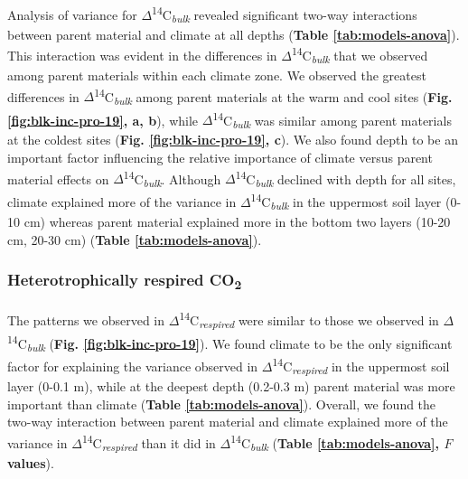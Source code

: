 \documentclass[english,man,floatsintext]{apa6}
\begin{document}
Analysis of variance for \(\Delta\)\textsuperscript{14}C\textsubscript{\emph{bulk}} revealed significant two-way interactions between parent material and climate at all depths (\textbf{Table \ref{tab:models-anova}}). This interaction was evident in the differences in \(\Delta\)\textsuperscript{14}C\textsubscript{\emph{bulk}} that we observed among parent materials within each climate zone. We observed the greatest differences in \(\Delta\)\textsuperscript{14}C\textsubscript{\emph{bulk}} among parent materials at the warm and cool sites (\textbf{Fig. \ref{fig:blk-inc-pro-19}, a, b}), while \(\Delta\)\textsuperscript{14}C\textsubscript{\emph{bulk}} was similar among parent materials at the coldest sites (\textbf{Fig. \ref{fig:blk-inc-pro-19}, c}). We also found depth to be an important factor influencing the relative importance of climate versus parent material effects on \(\Delta\)\textsuperscript{14}C\textsubscript{\emph{bulk}}. Although \(\Delta\)\textsuperscript{14}C\textsubscript{\emph{bulk}} declined with depth for all sites, climate explained more of the variance in \(\Delta\)\textsuperscript{14}C\textsubscript{\emph{bulk}} in the uppermost soil layer (0-10 cm) whereas parent material explained more in the bottom two layers (10-20 cm, 20-30 cm) (\textbf{Table \ref{tab:models-anova}}).

\hypertarget{heterotrophically-respired-co2}{%
\subsubsection{\texorpdfstring{Heterotrophically respired CO\textsubscript{2}}{Heterotrophically respired CO2}}\label{heterotrophically-respired-co2}}

The patterns we observed in \(\Delta\)\textsuperscript{14}C\textsubscript{\emph{respired}} were similar to those we observed in \(\Delta\)\textsuperscript{14}C\textsubscript{\emph{bulk}} (\textbf{Fig. \ref{fig:blk-inc-pro-19}}). We found climate to be the only significant factor for explaining the variance observed in \(\Delta\)\textsuperscript{14}C\textsubscript{\emph{respired}} in the uppermost soil layer (0-0.1 m), while at the deepest depth (0.2-0.3 m) parent material was more important than climate (\textbf{Table \ref{tab:models-anova}}). Overall, we found the two-way interaction between parent material and climate explained more of the variance in \(\Delta\)\textsuperscript{14}C\textsubscript{\emph{respired}} than it did in \(\Delta\)\textsuperscript{14}C\textsubscript{\emph{bulk}} (\textbf{Table \ref{tab:models-anova}, \(F\) values}).
\end{document}
